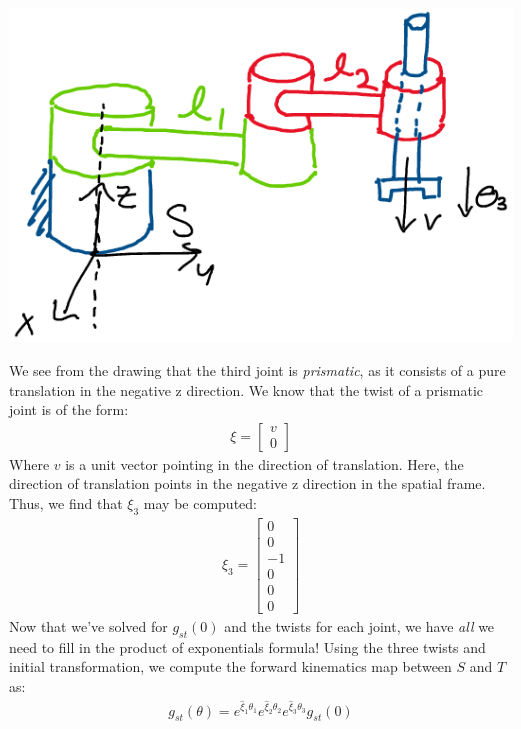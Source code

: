 \documentclass[oneside]{book}
\begin{document}
\begin{center}
    \includegraphics[scale=0.3]{images/joint3.png}
\end{center}
We see from the drawing that the third joint is \textit{prismatic}, as it consists of a pure translation in the negative z direction. We know that the twist of a prismatic joint is of the form:
\begin{align}
    \xi = 
    \begin{bmatrix}
    v\\
    0
    \end{bmatrix}
\end{align}
Where $v$ is a unit vector pointing in the direction of translation. Here, the direction of translation points in the negative z direction in the spatial frame. Thus, we find that $\xi_3$ may be computed:
\begin{align}
    \xi_3 = 
    \begin{bmatrix}
    0\\
    0\\
    -1\\
    0\\
    0\\
    0
    \end{bmatrix}
\end{align}
Now that we've solved for $g_{st}(0)$ and the twists for each joint, we have \textit{all} we need to fill in the product of exponentials formula! Using the three twists and initial transformation, we compute the forward kinematics map between $S$ and $T$ as:
\begin{align}
    g_{st}(\theta) = e^{\hat\xi_1\theta_1}e^{\hat\xi_2\theta_2}e^{\hat\xi_3\theta_3}g_{st}(0)
\end{align}
\end{document}
